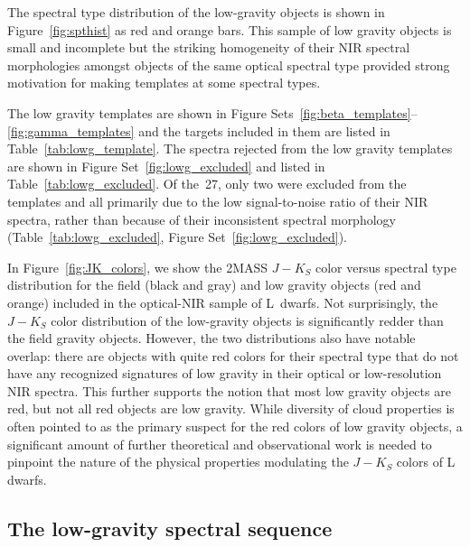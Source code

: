 \documentclass[12pt,preprint]{aastex}
\newcommand{\optLowG}{27}
\begin{document}
The spectral type distribution of the low-gravity objects is shown in Figure~\ref{fig:spthist} as red and orange bars.
This sample of low gravity objects is small and incomplete but the striking homogeneity of their NIR spectral morphologies amongst objects of the same optical spectral type provided strong motivation for making templates at some spectral types.

The low gravity templates are shown in Figure Sets~\ref{fig:beta_templates}--\ref{fig:gamma_templates} and the targets included in them are listed in Table~\ref{tab:lowg_template}.
The spectra rejected from the low gravity templates are shown in Figure Set~\ref{fig:lowg_excluded} and listed in Table~\ref{tab:lowg_excluded}. 
Of the~\optLowG, only two were excluded from the templates and all primarily due to the low signal-to-noise ratio of their NIR spectra, rather than because of their inconsistent spectral morphology (Table~\ref{tab:lowg_excluded}, Figure Set~\ref{fig:lowg_excluded}).

In Figure~\ref{fig:JK_colors}, we show the 2MASS $J-K_S$ color versus spectral type distribution for the field (black and gray) and low gravity objects (red and orange) included in the optical-NIR sample of L~dwarfs.
Not surprisingly, the $J-K_S$ color distribution of the low-gravity objects is significantly redder than the field gravity objects. 
However, the two distributions also have notable overlap: there are objects with quite red colors for their spectral type that do not have any recognized signatures of low gravity in their optical or low-resolution NIR spectra.
This further supports the notion that most low gravity objects are red, but not all red objects are low gravity.
While diversity of cloud properties is often pointed to as the primary suspect for the red colors of low gravity objects, a significant amount of further theoretical and observational work is needed to pinpoint the nature of the physical properties modulating the $J-K_S$ colors of L dwarfs.

\subsection{The low-gravity spectral sequence}
\end{document}
